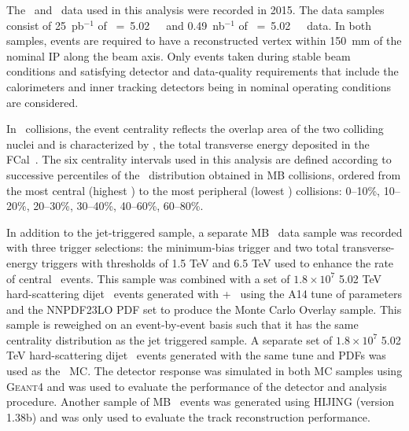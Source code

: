
The \PbPb\ and \pp\ data used in this analysis were recorded in 2015.
 The data samples consist of 25~pb$^{-1}$ of \sqrts~=~5.02~\TeV\ \pp\ and 0.49~nb$^{-1}$ of \sqrtsnn~=~5.02~\TeV\
\pbpb\ data. In both samples, events are required to have a reconstructed vertex
within 150~mm of the nominal IP along the beam axis.
Only events taken during stable beam conditions and satisfying detector and data-quality requirements that include the calorimeters and inner tracking detectors being in nominal operating conditions are considered. 



In \PbPb\ collisions, the event centrality reflects the overlap area of the two colliding nuclei and is characterized by \ETfcal, the total transverse energy deposited in the 
FCal~\cite{Aaboud:2017tql}. The six centrality intervals used in this analysis are defined according to successive percentiles of the \ETfcal\ distribution obtained in MB collisions, ordered from the most central (highest \ETfcal) to the most peripheral (lowest \ETfcal) collisions: 0--10\%, 10--20\%, 20--30\%, 30--40\%, 40--60\%, 60--80\%. 

In addition to the jet-triggered sample, a separate MB \PbPb\ data sample was recorded with three trigger selections: the minimum-bias trigger and two total transverse-energy triggers with thresholds of 1.5 TeV and 6.5 TeV used to enhance the rate of central \pbpb\ events. This sample was combined with a set of $1.8\times10^7$ 5.02 TeV hard-scattering dijet \pp\ events generated with \powheg{}+\pythiaeight\ \cite{Nason:2004rx,Sjostrand:2014zea} using the A14 tune of parameters \cite{ATLAS2014021} and the NNPDF23LO PDF set \cite{Ball:2012cx} to produce the Monte Carlo Overlay sample. This sample is reweighed on an event-by-event basis such that it has the same centrality distribution as the jet triggered sample.
A separate set of $1.8\times10^7$ 5.02 TeV hard-scattering dijet \pp\ events generated with the same tune and PDFs was used as the \pp\ MC. The detector response was simulated in both MC samples using \textsc{Geant4} \cite{Agostinelli:2002hh,Aad:2010ah} and was used to evaluate the performance of the detector and analysis procedure. Another sample of MB \pbpb\ events was generated using HIJING (version 1.38b) \cite{Aad:2010ah} and was only used to evaluate the track reconstruction performance. 	


